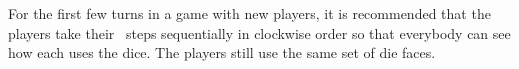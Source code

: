 For the first few turns in a game with new players, it is recommended that the players take their \development\ steps sequentially in clockwise order so that everybody can see how each uses the dice.  The players still use the same set of die faces.
